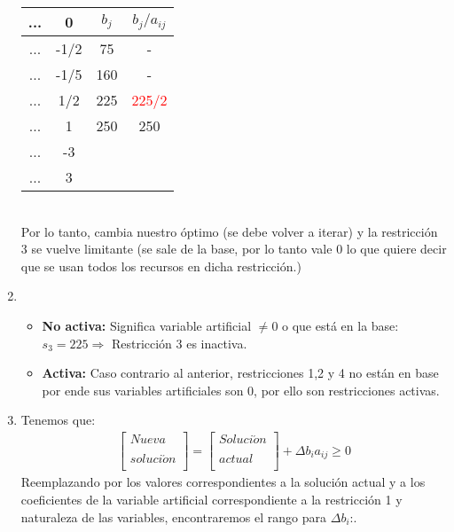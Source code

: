 \begin{enumerate}
\begin{table}[ht]
\begin{tabular}{ cc|cc }
				... & 0& $b_j$ & $b_j/a_{ij} $\\
				\hline
				... & -1/2 & 75 & -\\
				... & -1/5 & 160 & - \\
				... & 1/2 & 225 & \textcolor{red}{225/2} \\
				... & 1 & 250 & 250 \\
				\hline
				... & -3 & & \\
				... & 3 & & \\
			\end{tabular}
		\end{table}
		\\Por lo tanto, cambia nuestro óptimo (se debe volver a iterar) y la restricción 3 se vuelve limitante
		(se sale de la base, por lo tanto vale 0 lo que quiere decir que se usan todos los recursos en dicha
		restricción.)
	\item
		\begin{itemize}
			\item 
				\textbf{No activa:} Significa variable artificial $\neq 0$ o
				que está en la base: $s_3 = 225 \Rightarrow$ Restricción 3 es
				inactiva.
			\item 
				\textbf{Activa:} Caso contrario al anterior, restricciones 1,2 
				y 4 no están en base por ende sus variables artificiales son 0,
				por ello son restricciones activas.
		\end{itemize}
	\item Tenemos que:
		\begin{align*}
			\left[{
				\begin{array}{c}
					Nueva\\
					\\
					soluci\acute{o}n\\			
				\end{array} 
			} \right] 
			=
			\left[{
				\begin{array}{c}
					Soluci\acute{o}n\\
					\\
					actual\\
				\end{array} 
			} \right] 
			+
			\Delta{b_i}a_{ij} \geq 0
		\end{align*}
		Reemplazando por los valores correspondientes a la solución actual y a
		los coeficientes de la variable artificial correspondiente a la
		restricción 1 y naturaleza de las variables, encontraremos el rango para
		$\Delta{b_i}$:.
		\begin{align*}
			\hspace{5.33cm}

\end{align*}
\end{enumerate}
